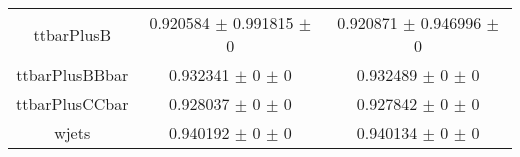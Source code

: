 \begin{table}
\begin{tabular}{ccc}
ttbarPlusB & \num{0.920584} $\pm$ \num{0.991815} $\pm$ \num{0} & \num{0.920871} $\pm$ \num{0.946996} $\pm$ \num{0}\\
ttbarPlusBBbar & \num{0.932341} $\pm$ \num{0} $\pm$ \num{0} & \num{0.932489} $\pm$ \num{0} $\pm$ \num{0}\\
ttbarPlusCCbar & \num{0.928037} $\pm$ \num{0} $\pm$ \num{0} & \num{0.927842} $\pm$ \num{0} $\pm$ \num{0}\\
wjets & \num{0.940192} $\pm$ \num{0} $\pm$ \num{0} & \num{0.940134} $\pm$ \num{0} $\pm$ \num{0}\\
\bottomrule
\end{tabular}
\end{table}